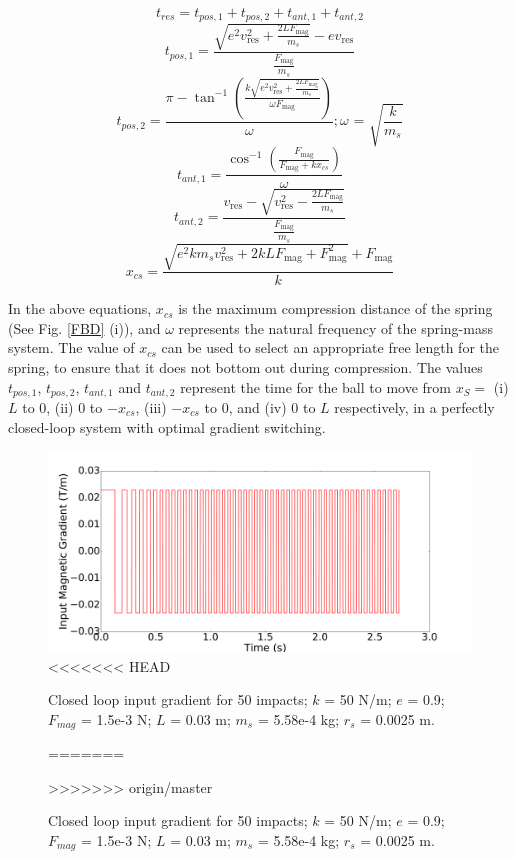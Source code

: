 \documentclass[letterpaper, 10 pt, conference]{ieeeconf}  %
\begin{document}
\begin{equation}
t_{res}=t_{pos,1}+t_{pos,2}+t_{ant,1}+t_{ant,2}
\label{tres6}
\end{equation}	
\begin{equation}
t_{pos,1}=\frac{\sqrt{e^2 v_{\text{res}}^2+\frac{2 L F_{\text{mag}}}{m_s}}-e v_{\text{res}}}{\frac{F_{\text{mag}}}{m_s}}
\label{tres1}
\end{equation}
\begin{equation}
t_{pos,2}=\frac{\pi -\tan ^{-1}\left(\frac{k \sqrt{e^2 v_{\text{res}}^2+\frac{2 L F_{\text{mag}}}{m_s}}}{\omega  F_{\text{mag}}}\right)}{\omega } ; \text{$\omega $ = }
\sqrt{\frac{k}{m_s}}
\label{tres2}
\end{equation}
\begin{equation}
t_{ant,1}=\frac{\cos ^{-1}\left(\frac{F_{\text{mag}}}{F_{\text{mag}}+k x_{cs}}\right)}{\omega }
\label{tres3}
\end{equation}
\begin{equation}
t_{ant,2}=\frac{v_{\text{res}}-\sqrt{v_{\text{res}}^2-\frac{2 L F_{\text{mag}}}{m_s}}}{\frac{F_{\text{mag}}}{m_s}}
\label{tres4}
\end{equation}
\begin{equation}
x_{cs}=\frac{\sqrt{e^2 k m_s v_{\text{res}}^2+2 k L F_{\text{mag}}+F_{\text{mag}}^2}+F_{\text{mag}}}{k}
\label{tres5}
\end{equation}


In the above equations, $x_{cs}$ is the maximum compression distance of the spring (See Fig. \ref{FBD} (i)), and $\omega$ represents the natural frequency of the spring-mass system. The value of $x_{cs}$ can be used to select an appropriate free length for the spring, to ensure that it does not bottom out during compression. The values $t_{pos,1}$, $t_{pos,2}$, $t_{ant,1}$ and $t_{ant,2}$ represent the time for the ball to move from $x_S =$ (i) $L$ to 0, (ii) 0 to $-x_{cs}$, (iii) $-x_{cs}$ to 0, and (iv) 0 to $L$ respectively, in a perfectly closed-loop system with optimal gradient switching.



\begin{figure}
	\includegraphics[width=\linewidth]{CLinput.pdf}
<<<<<<< HEAD
	\caption{Closed loop input gradient for 50 impacts; $k$ = 50 N/m; $e$ = 0.9; $F_{mag}$ = 1.5e-3 N; $L$ = 0.03 m; $m_s$ = 5.58e-4 kg; $r_s$ = 0.0025 m.}
=======
	\caption{Closed loop input gradient for 50 impacts; $k$ = 50 N/m; $e$ = 0.9; $F_{mag}$ = 1.5e-3 N; $L$ = 0.03 m; $m_s$ = 5.58e-4 kg; $r_s$ = 0.0025 m.}
>>>>>>> origin/master
	\label{CLinput}
	
\end{figure}
\end{document}
